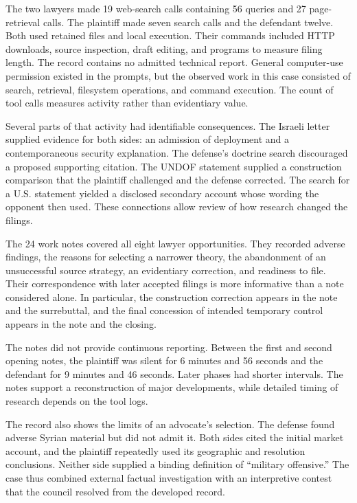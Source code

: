 \documentclass[11pt]{article}
\begin{document}
The two lawyers made 19 web-search calls containing 56 queries and 27 page-retrieval calls.  The plaintiff made seven search calls and the defendant twelve.  Both used retained files and local execution.  Their commands included HTTP downloads, source inspection, draft editing, and programs to measure filing length.  The record contains no admitted technical report.  General computer-use permission existed in the prompts, but the observed work in this case consisted of search, retrieval, filesystem operations, and command execution.  The count of tool calls measures activity rather than evidentiary value.

Several parts of that activity had identifiable consequences.  The Israeli letter supplied evidence for both sides: an admission of deployment and a contemporaneous security explanation.  The defense's doctrine search discouraged a proposed supporting citation.  The UNDOF statement supplied a construction comparison that the plaintiff challenged and the defense corrected.  The search for a U.S. statement yielded a disclosed secondary account whose wording the opponent then used.  These connections allow review of how research changed the filings.

The 24 work notes covered all eight lawyer opportunities.  They recorded adverse findings, the reasons for selecting a narrower theory, the abandonment of an unsuccessful source strategy, an evidentiary correction, and readiness to file.  Their correspondence with later accepted filings is more informative than a note considered alone.  In particular, the construction correction appears in the note and the surrebuttal, and the final concession of intended temporary control appears in the note and the closing.

The notes did not provide continuous reporting.  Between the first and second opening notes, the plaintiff was silent for 6 minutes and 56 seconds and the defendant for 9 minutes and 46 seconds.  Later phases had shorter intervals.  The notes support a reconstruction of major developments, while detailed timing of research depends on the tool logs.

The record also shows the limits of an advocate's selection.  The defense found adverse Syrian material but did not admit it.  Both sides cited the initial market account, and the plaintiff repeatedly used its geographic and resolution conclusions.  Neither side supplied a binding definition of ``military offensive.''  The case thus combined external factual investigation with an interpretive contest that the council resolved from the developed record.
\end{document}

